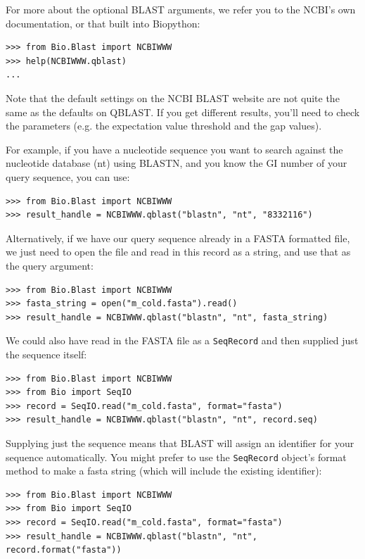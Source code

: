 \documentclass{report}
\begin{document}
For more about the optional BLAST arguments, we refer you to the NCBI's own
documentation, or that built into Biopython:

\begin{verbatim}
>>> from Bio.Blast import NCBIWWW
>>> help(NCBIWWW.qblast)
...
\end{verbatim}

Note that the default settings on the NCBI BLAST website are not quite
the same as the defaults on QBLAST. If you get different results, you'll
need to check the parameters (e.g. the expectation value threshold and
the gap values).

For example, if you have a nucleotide sequence you want to search against
the nucleotide database (nt) using BLASTN, and you know the GI number of your
query sequence, you can use:

\begin{verbatim}
>>> from Bio.Blast import NCBIWWW
>>> result_handle = NCBIWWW.qblast("blastn", "nt", "8332116")
\end{verbatim}

Alternatively, if we have our query sequence already in a FASTA formatted
file, we just need to open the file and read in this record as a string,
and use that as the query argument:

\begin{verbatim}
>>> from Bio.Blast import NCBIWWW
>>> fasta_string = open("m_cold.fasta").read()
>>> result_handle = NCBIWWW.qblast("blastn", "nt", fasta_string)
\end{verbatim}

We could also have read in the FASTA file as a \verb|SeqRecord| and then
supplied just the sequence itself:

\begin{verbatim}
>>> from Bio.Blast import NCBIWWW
>>> from Bio import SeqIO
>>> record = SeqIO.read("m_cold.fasta", format="fasta")
>>> result_handle = NCBIWWW.qblast("blastn", "nt", record.seq)
\end{verbatim}

Supplying just the sequence means that BLAST will assign an identifier
for your sequence automatically.  You might prefer to use the
\verb|SeqRecord| object's format method to make a fasta string
(which will include the existing identifier):

\begin{verbatim}
>>> from Bio.Blast import NCBIWWW
>>> from Bio import SeqIO
>>> record = SeqIO.read("m_cold.fasta", format="fasta")
>>> result_handle = NCBIWWW.qblast("blastn", "nt", record.format("fasta"))
\end{verbatim}
\end{document}
